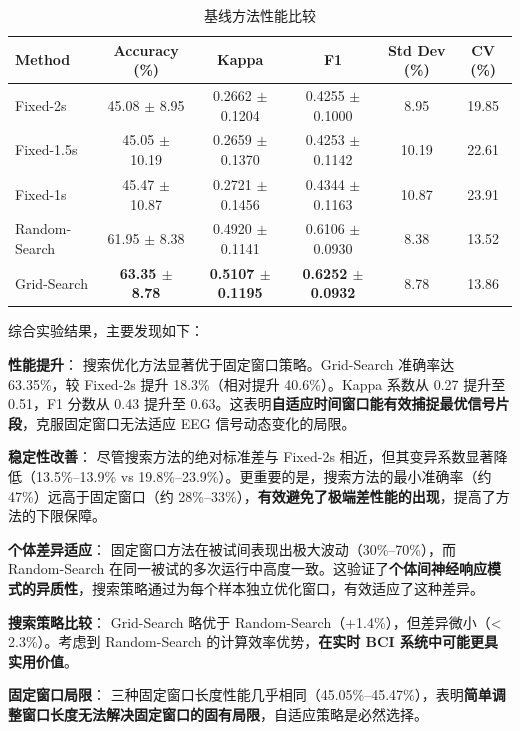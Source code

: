 \begin{table}[H]
\centering
\caption{基线方法性能比较}
\label{tab:baseline_comparison}
\small
\begin{tabular}{lccccc}
\hline
\textbf{Method} & \textbf{Accuracy (\%)} & \textbf{Kappa} & \textbf{F1} & \textbf{Std Dev (\%)} & \textbf{CV (\%)} \\
\hline
Fixed-2s & 45.08 $\pm$ 8.95 & 0.2662 $\pm$ 0.1204 & 0.4255 $\pm$ 0.1000 & 8.95 & 19.85  \\
Fixed-1.5s & 45.05 $\pm$ 10.19 & 0.2659 $\pm$ 0.1370 & 0.4253 $\pm$ 0.1142 & 10.19 & 22.61  \\
Fixed-1s & 45.47 $\pm$ 10.87 & 0.2721 $\pm$ 0.1456 & 0.4344 $\pm$ 0.1163 & 10.87 & 23.91  \\
Random-Search & 61.95 $\pm$ 8.38 & 0.4920 $\pm$ 0.1141 & 0.6106 $\pm$ 0.0930 & 8.38 & 13.52  \\
Grid-Search & \textbf{63.35 $\pm$ 8.78} & \textbf{0.5107 $\pm$ 0.1195} & \textbf{0.6252 $\pm$ 0.0932} & 8.78 & 13.86  \\
\hline
\end{tabular}
\end{table}

\label{subsec:results_analysis}

综合实验结果，主要发现如下：

\textbf{性能提升}： 搜索优化方法显著优于固定窗口策略。Grid-Search 准确率达 63.35\%，较 Fixed-2s 提升 18.3\%（相对提升 40.6\%）。Kappa 系数从 0.27 提升至 0.51，F1 分数从 0.43 提升至 0.63。这表明\textbf{自适应时间窗口能有效捕捉最优信号片段}，克服固定窗口无法适应 EEG 信号动态变化的局限。

\textbf{稳定性改善}： 尽管搜索方法的绝对标准差与 Fixed-2s 相近，但其变异系数显著降低（13.5\%--13.9\% vs 19.8\%--23.9\%）。更重要的是，搜索方法的最小准确率（约 47\%）远高于固定窗口（约 28\%--33\%），\textbf{有效避免了极端差性能的出现}，提高了方法的下限保障。

\textbf{个体差异适应}： 固定窗口方法在被试间表现出极大波动（30\%--70\%），而 Random-Search 在同一被试的多次运行中高度一致。这验证了\textbf{个体间神经响应模式的异质性}，搜索策略通过为每个样本独立优化窗口，有效适应了这种差异。

\textbf{搜索策略比较}： Grid-Search 略优于 Random-Search（+1.4\%），但差异微小（< 2.3\%）。考虑到 Random-Search 的计算效率优势，\textbf{在实时 BCI 系统中可能更具实用价值}。

\textbf{固定窗口局限}： 三种固定窗口长度性能几乎相同（45.05\%--45.47\%），表明\textbf{简单调整窗口长度无法解决固定窗口的固有局限}，自适应策略是必然选择。


